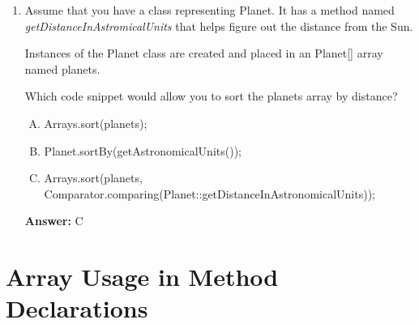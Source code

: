 \documentclass[12pt]{article}
\begin{document}
\begin{enumerate}[1.]
    \item

    Assume that you have a class representing Planet. It has a method named\\
    \textit{getDistanceInAstromicalUnits} that helps figure out the distance from the Sun.

    \bigskip

    Instances of the Planet class are created and placed in an Planet[] array named
    planets.

    \bigskip

    Which code snippet would allow you to sort the planets array by distance?

    \begin{enumerate}[A.]
        \item Arrays.sort(planets);
        \item Planet.sortBy(getAstronomicalUnits());
        \item Arrays.sort(planets, Comparator.comparing(Planet::getDistanceInAstronomicalUnits));
    \end{enumerate}

    \bigskip

    \textbf{Answer:} C

\end{enumerate}

\bigskip

\section{Array Usage in Method Declarations}

\bigskip
\end{document}
